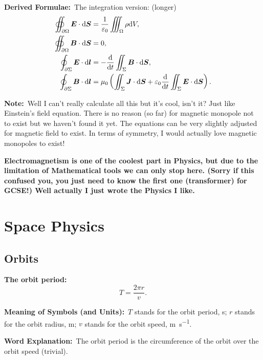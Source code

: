 \documentclass[8pt]{article}
\newcommand{\MeanSymb}{\textbf{Meaning of Symbols (and Units):}\ }
\newcommand{\WordExpl}{\textbf{Word Explanation:}\ }
\newcommand{\DeriForm}{\textbf{Derived Formulae:}\ }
\newcommand{\Note}{\textbf{Note:}\ }
\begin{document}
\begin{enumerate}
                \DeriForm The integration version: (longer)
                \begin{align*}
                    \oiint_{\partial \Omega} \boldsymbol{E} \cdot \mathrm{d} \boldsymbol{S} &= \frac{1}{\varepsilon_0} \iiint_{\Omega} \rho \mathrm{d} V,\\
                    \oiint_{\partial \Omega} \boldsymbol{B} \cdot \mathrm{d} \boldsymbol{S} &= 0,\\
                    \oint_{\partial \Sigma} \boldsymbol{E} \cdot \mathrm{d} \boldsymbol{l} &= - \frac{\mathrm{d}}{\mathrm{d} t} \iint_{\Sigma} \boldsymbol{B} \cdot \mathrm{d} \boldsymbol{S},\\
                    \oint_{\partial \Sigma} \boldsymbol{B} \cdot \mathrm{d} \boldsymbol{l} &= \mu_0 \left(\iint_{\Sigma} \boldsymbol{J} \cdot \mathrm{d} \boldsymbol{S} + \varepsilon_0 \frac{\mathrm{d}}{\mathrm{d} t} \iint_{\Sigma} \boldsymbol{E} \cdot \mathrm{d} \boldsymbol{S}\right).
                \end{align*}

                \Note Well I can't really calculate all this but it's cool, isn't it? Just like Einstein's field equation. There is no reason (so far) for magnetic monopole not to exist but we haven't found it yet. The equations can be very slightly adjusted for magnetic field to exist. In terms of symmetry, I would actually love magnetic monopoles to exist!
            \end{enumerate}

            \textbf{Electromagnetism is one of the coolest part in Physics, but due to the limitation of Mathematical tools we can only stop here. (Sorry if this confused you, you just need to know the first one (transformer) for GCSE!) Well actually I just wrote the Physics I like.}

    \section{Space Physics}
        \subsection{Orbits}
            \textbf{The orbit period:}
            \[
                T = \frac{2 \pi r}{v}.
            \]

            \MeanSymb \(T\) stands for the orbit period, \unit{\second}; \(r\) stands for the orbit radius, \unit{\metre}; \(v\) stands for the orbit speed, \unit{\metre\per\second}.

            \WordExpl The orbit period is the circumference of the orbit over the orbit speed (trivial).
\end{document}
